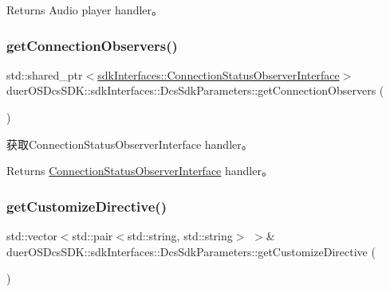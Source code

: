 \begin{DoxyReturn}{Returns}
Audio player handler。 
\end{DoxyReturn}
\mbox{\label{structduerOSDcsSDK_1_1sdkInterfaces_1_1DcsSdkParameters_adfd39ff4af037a2844d1e977eb00b8c5}} 
\subsubsection{\texorpdfstring{get\+Connection\+Observers()}{getConnectionObservers()}}
{\footnotesize\ttfamily std\+::shared\+\_\+ptr$<$\hyperlink{classduerOSDcsSDK_1_1sdkInterfaces_1_1ConnectionStatusObserverInterface}{sdk\+Interfaces\+::\+Connection\+Status\+Observer\+Interface}$>$ duer\+O\+S\+Dcs\+S\+D\+K\+::sdk\+Interfaces\+::\+Dcs\+Sdk\+Parameters\+::get\+Connection\+Observers (\begin{DoxyParamCaption}{ }\end{DoxyParamCaption})\hspace{0.3cm}{\ttfamily [inline]}}



获取\+Connection\+Status\+Observer\+Interface handler。 

\begin{DoxyReturn}{Returns}
\hyperlink{classduerOSDcsSDK_1_1sdkInterfaces_1_1ConnectionStatusObserverInterface}{Connection\+Status\+Observer\+Interface} handler。 
\end{DoxyReturn}
\mbox{\label{structduerOSDcsSDK_1_1sdkInterfaces_1_1DcsSdkParameters_a0622206b1833f62c98e79de840698645}} 
\subsubsection{\texorpdfstring{get\+Customize\+Directive()}{getCustomizeDirective()}}
{\footnotesize\ttfamily std\+::vector$<$std\+::pair$<$std\+::string, std\+::string$>$ $>$\& duer\+O\+S\+Dcs\+S\+D\+K\+::sdk\+Interfaces\+::\+Dcs\+Sdk\+Parameters\+::get\+Customize\+Directive (\begin{DoxyParamCaption}{ }\end{DoxyParamCaption})\hspace{0.3cm}{\ttfamily [inline]}}



